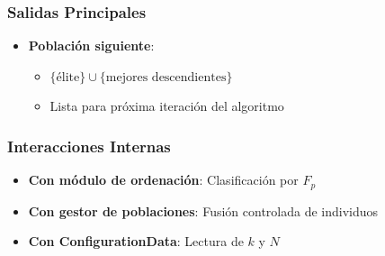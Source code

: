 \subsubsection{Salidas Principales}
\begin{itemize}
    \item \textbf{Población siguiente}:
    \begin{itemize}
        \item $\{\text{élite}\} \cup \{\text{mejores descendientes}\}$
        \item Lista para próxima iteración del algoritmo
    \end{itemize}
\end{itemize}

\subsubsection{Interacciones Internas}
\begin{itemize}
    \item \textbf{Con módulo de ordenación}: Clasificación por $F_p$
    \item \textbf{Con gestor de poblaciones}: Fusión controlada de individuos
    \item \textbf{Con ConfigurationData}: Lectura de $k$ y $N$
\end{itemize}
\newpage
